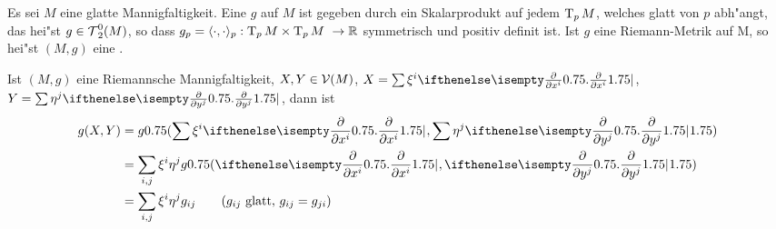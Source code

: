 \begin{Dfn}
Es sei $M$ eine glatte Mannigfaltigkeit. Eine  $g$ auf $M$ ist gegeben durch ein Skalarprodukt auf jedem $\operatorname{T}_pM$, welches glatt von $p$ abh"angt, das hei"st $g \in \operatorname{\mathcal{T}}_2^0(M)$, so dass $g_p = \langle \cdot, \cdot \rangle_p : \operatorname{T}_pM \times \operatorname{T}_pM \ \to \operatorname{\mathbb{R}}$ symmetrisch und positiv definit ist. Ist $g$ eine Riemann-Metrik auf M, so hei"st $(M,g)$ eine .
\end{Dfn}

Ist $(M,g)$ eine Riemannsche Mannigfaltigkeit, $X, Y \in \operatorname{\mathcal{V}}(M)$, $X = \sum \xi^{i} \pdifffrac{}{x^{i}}$, $Y = \sum \eta^j \pdifffrac{}{y^j}$, dann ist
\begin{align*}
	g(X, Y) &= g\left(\sum \xi^{i} \pdifffrac{}{x^{i}}, \sum \eta^j \pdifffrac{}{y^j}\right)\\
	&= \sum_{i,j}\xi^{i} \eta^j g\left(\pdifffrac{}{x^{i}}, \pdifffrac{}{y^j}\right)\\
	&= \sum_{i,j} \xi^{i} \eta^j g_{ij} \qquad (g_{ij} \text{ glatt, } g_{ij} = g_{ji})
\end{align*}


